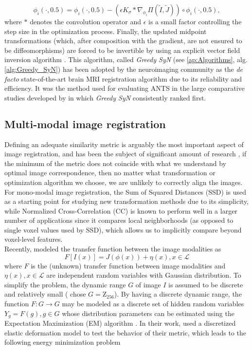 \begin{equation}\label{eq:gsyn_update}
    \phi_{i}(\cdot, 0.5) = \phi_{i}(\cdot, 0.5) - \left( \epsilon K_{\sigma} \ast \nabla_{\phi_{i}} \Pi(\tilde{I}, \tilde{J}) \right) \circ \phi_{i}(\cdot, 0.5),
\end{equation}
where $\ast$ denotes the convolution operator and $\epsilon$ is a small factor controlling the step size in the optimization process. Finally, the updated midpoint transformations (which, after composition with the gradient, are not ensured to be diffeomorphisms) are forced to be invertible by using an explicit vector field inversion algorithm \citep{Chen2008}. This algorithm, called \textit{Greedy SyN} (see \ref{ap:Algorithms}, alg. \ref{alg:Greedy_SyN}) has been adopted by the neuroimaging community as the \textit{de facto} state-of-the-art brain MRI registration algorithm due to its reliability and efficiency. It was the method used for evaluating ANTS \citep{Avants2011} in the large comparative studies developed by \cite{Klein2009, Klein2010} in which \textit{Greedy SyN} consistently ranked first.

\subsection{Multi-modal image registration}

Defining an adequate similarity metric is arguably the most important aspect of image registration, and has been the subject of significant amount of research \citep{Sotiras2013}, if the minimum of the metric does not coincide with what we understand by optimal image correspondence, then no matter what transformation or optimization algorithm we choose, we are unlikely to correctly align the images. For mono-modal image registration, the Sum of Squared Distances (SSD) is used as a starting point for studying new transformation methods due to its simplicity, while Normalized Cross-Correlation (CC) is known to perform well in a larger number of applications since it compares local neighborhoods (as opposed to single voxel values used by SSD), which allows us to implicitly compare beyond voxel-level features.\\

Recently, \cite{Arce-santana2014} modeled the transfer function between the image modalities as
\begin{equation}\label{eq:arce_model}
    F[I(x)] = J(\phi(x)) + \eta(x), x\in \mathcal{L}
\end{equation}
where $F$ is the (unknown) transfer function between image modalities and $\eta(x), x\in \mathcal{L}$ are independent random variables with Gaussian distribution. To simplify
the problem, the dynamic range $G$ of image $I$ is assumed to be discrete and relatively small (\cite{Arce-santana2014} chose $G = \mathrm{Z}_{256}$). By having a discrete
dynamic range, the function $F: G \rightarrow G$ may be modeled as a discrete set of hidden random variables $Y_g = F(g), g\in G$ whose distribution parameters
can be estimated using the Expectation Maximization (EM) algorithm \citep{Dempster1977}. In their work, \cite{Arce-santana2014} used a discretized elastic
deformation model to test the behavior of their metric, which leads to the following energy minimization problem

